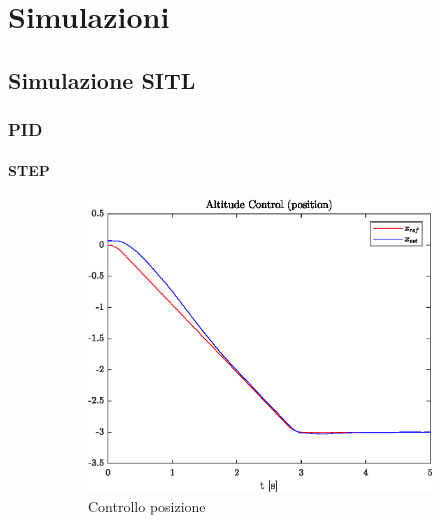 \chapter{Simulazioni}

\section{Simulazione SITL}

\subsection{PID}
\subsubsection{STEP}
\begin{figure}
	\centering
	\begin{subfigure}{0.45\textwidth}
		\centering
		\includegraphics[width=1\textwidth]{Simulazioni/Figure/PID/STEP/AltitudeControlPos}
		\caption{Controllo posizione}
	\end{subfigure}
	\hfill
	\begin{subfigure}{0.45\textwidth}
		\centering

\end{subfigure}
\end{figure}
